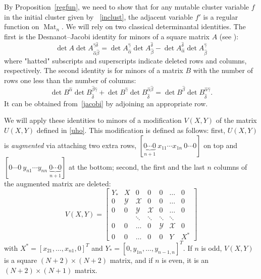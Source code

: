 \documentclass{amsart}
\theoremstyle{definition}
\theoremstyle{remark}
\numberwithin{equation}{section}
\numberwithin{theorem}{section}
\begin{document}
By Proposition~\ref{regfun},
we need to show that for any mutable cluster variable $f$ in  the initial cluster given by 
~\eqref{inclust}, the adjacent variable $f'$ is a regular function
on ${\operatorname{Mat}}_n$. We will rely on two classical determinantal identities. 
The first is the Desnanot--Jacobi identity for minors of a square matrix $A$ (see \cite[Th.~3.12]{Br}):
\begin{equation}
\label{jacobi}
\det A \det A_{\hat \alpha \hat \beta}^{\hat \gamma \hat \delta} = 
\det A_{\hat \alpha }^{ \hat \gamma} \det A_{\hat \beta}^{ \hat \delta}-
\det A_{\hat \alpha }^{ \hat \delta} \det A_{\hat \beta}^{ \hat \gamma}
\end{equation}
where "hatted" subscripts and superscripts indicate deleted rows and columns, respectively. 
The second identity is for minors
of a matrix $B$ with the number of rows one less than the number of columns:
\begin{equation}
\label{notjacobi}
\det B^{\hat \alpha} \det B^{\hat \beta \hat \gamma}_{\hat \delta} + 
\det B^{\hat \gamma} \det B^{\hat \alpha\hat \beta}_{\hat \delta} = 
\det B^{\hat \beta} \det B^{\hat \alpha \hat \gamma}_{\hat \delta}.
\end{equation}
It can be obtained from~\eqref{jacobi} by adjoining an appropriate row.

 We will apply these identities to minors of a modification $V(X,Y)$ of the matrix
 $U(X,Y)$ defined in \eqref{uho}. This modification is defined as follows: 
 first, $U(X,Y)$ is {\it augmented\/} via
 attaching two extra rows, $[\underbrace{0\cdots 0}_{n+1}\ x_{11} \cdots x_{1n} \ 0 \cdots 0]$ on top 
 and $[ 0  \cdots 0 \ y_{n1} \cdots y_{nn} \ \underbrace{0\cdots 0}_{n+1}]$ at the bottom;
 second, the first and the last $n$ columns of the augmented matrix are deleted:
 $$
 V(X,Y)=\begin{bmatrix}
 Y_* & X & 0 & 0 & 0 & \hdots & 0\\
 0 & {{\mathcal Y}} & {{\mathcal X}} & 0 & 0 & \hdots & 0\\
 0 & 0 & {{\mathcal Y}} & {{\mathcal X}} & 0 & \hdots & 0\\
   &  & \ddots & \ddots & \ddots & \ddots &\\
 0 & 0 & \hdots & 0 & {{\mathcal Y}} & {{\mathcal X}} & 0\\
 0 & 0 & \hdots & 0 & 0 & Y & X^*  
 \end{bmatrix}
 $$
 with $X^*=[x_{21}, \hdots, x_{n1}, 0]^T$ and $Y_*=[0, y_{1n}, \hdots, y_{n-1,n}]^T$. 
 If $n$ is odd, $V(X, Y)$ is a square $(N+2)\times (N+2)$ matrix, and if $n$ is even, it
 is an $(N+2)\times (N+1)$ matrix.
 
\end{document}
